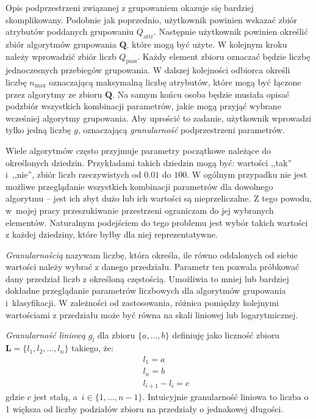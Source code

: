 \documentclass[../thesis.tex]{subfiles}
\begin{document}
Opis podprzestrzeni związanej z grupowaniem okazuje się bardziej skomplikowany. Podobnie jak poprzednio, użytkownik powinien wskazać zbiór atrybutów poddanych grupowaniu $Q_\textrm{attr}$. Następnie użytkownik powinien określić zbiór algorytmów grupowania $\textbf{Q}$, które mogą być użyte. W kolejnym kroku należy wprowadzić zbiór liczb $Q_\textrm{pass}$. Każdy element zbioru oznaczać będzie liczbę jednoczesnych przebiegów grupowania. W dalszej kolejności odbiorca określi liczbę $n_\textrm{max}$ oznaczającą maksymalną liczbę atrybutów, które mogą być łączone przez algorytmy ze zbioru $\textbf{Q}$. Na samym końcu osoba będzie musiała opisać podzbiór wszystkich kombinacji parametrów, jakie mogą przyjąć wybrane wcześniej algorytmy grupowania. Aby uprościć to zadanie, użytkownik wprowadzi tylko jedną liczbę $g$, oznaczającą \textit{granularność} podprzestrzeni parametrów. 

Wiele algorytmów często przyjmuje parametry początkowe należące do określonych dziedzin. Przykładami takich dziedzin mogą być: wartości ,,tak'' i~,,nie'', zbiór liczb rzeczywistych od $0.01$ do $100$. W ogólnym przypadku nie jest możliwe przeglądanie wszystkich kombinacji parametrów dla dowolnego algorytmu -- jest ich zbyt dużo lub ich wartości są nieprzeliczalne. Z tego powodu, w~mojej pracy przeszukiwanie przestrzeni ograniczam do jej wybranych elementów. Naturalnym podejściem do tego problemu jest wybór takich wartości z każdej dziedziny, które byłby dla niej reprezentatywne. 

\emph{Granularnością} nazywam liczbę, która określa, ile równo oddalonych od siebie wartości należy wybrać z danego przedziału. Parametr ten pozwala próbkować dany przedział liczb z określoną częstością. Umożliwia to mniej lub bardziej dokładne przeglądanie parametrów liczbowych dla algorytmów grupowania i~klasyfikacji. W zależności od zastosowania, różnica pomiędzy kolejnymi wartościami z przedziału może być równa na skali liniowej lub logarytmicznej.

\textit{Granularność liniową} $g_l$ dla zbioru $\{a, \ldots, b\}$ definiuję jako liczność zbioru $\textbf{L} = \{l_1, l_2, \ldots, l_n\}$ takiego, że:
\begin{eqnarray*}
&& l_1 = a~\\
&& l_n = b \\
&& l_{i+1} - l_i = c
\end{eqnarray*}
gdzie $c$ jest stałą, a~$i \in \{1, \ldots, n-1\}$. Intuicyjnie granularność liniowa to liczba o 1 większa od liczby podziałów zbioru na przedziały o jednakowej długości.
\end{document}
